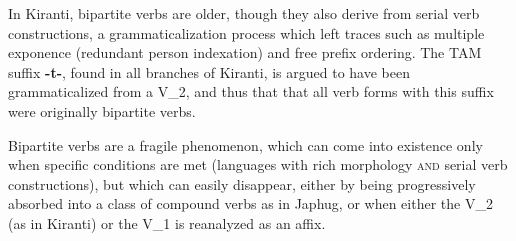\documentclass[oneside,a4paper,11pt]{article}
\newcommand{\ipa}[1]{{\phon\textbf{#1}}}
\begin{document}
In Kiranti, bipartite verbs are older, though they also derive from serial verb constructions, a grammaticalization process which left traces such as multiple exponence (redundant person indexation) and free prefix ordering. The TAM suffix \ipa{-t-}, found in all branches of Kiranti, is argued to have been grammaticalized from a V_2, and thus that that all verb forms with this suffix were originally bipartite verbs. 

Bipartite verbs are a fragile phenomenon, which can come into existence only when specific conditions are met (languages with rich morphology \textsc{and} serial verb constructions), but which can easily disappear, either by being progressively absorbed into a class of compound verbs as in Japhug, or when either the V_2 (as in Kiranti) or the V_1 is reanalyzed as an affix.





 
\end{document}
